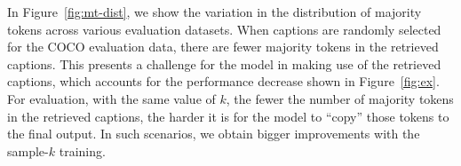In Figure~\ref{fig:mt-dist}, we show the variation in the distribution of majority tokens across various evaluation datasets. When captions are randomly selected for the COCO evaluation data, there are fewer majority tokens in the retrieved captions. This presents a challenge for the model in making use of the retrieved captions, which accounts for the performance decrease shown in Figure~\ref{fig:ex}. For evaluation, with the same value of $k$, the fewer the number of majority tokens in the retrieved captions, the harder it is for the model to ``copy'' those tokens to the final output. In such scenarios, we obtain bigger improvements with the sample-$k$ training.





